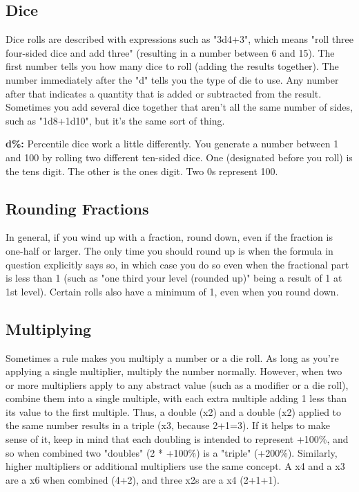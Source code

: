 \subsection{Dice}
Dice rolls are described with expressions such as "3d4+3", which means "roll three four-sided dice and add three" (resulting in a number between 6 and 15). The first number tells you how many dice to roll (adding the results together). The number immediately after the "d" tells you the type of die to use. Any number after that indicates a quantity that is added or subtracted from the result. Sometimes you add several dice together that aren't all the same number of sides, such as "1d8+1d10", but it's the same sort of thing.

\textbf{d\%:} Percentile dice work a little differently. You generate a number between 1 and 100 by rolling two different ten-sided dice. One (designated before you roll) is the tens digit. The other is the ones digit. Two 0s represent 100.

\subsection{Rounding Fractions}
In general, if you wind up with a fraction, round down, even if the fraction is one-half or larger. The only time you should round up is when the formula in question explicitly says so, in which case you do so even when the fractional part is less than 1 (such as "one third your level (rounded up)" being a result of 1 at 1st level). Certain rolls also have a minimum of 1, even when you round down.

\subsection{Multiplying}
Sometimes a rule makes you multiply a number or a die roll. As long as you're applying a single multiplier, multiply the number normally. However, when two or more multipliers apply to any abstract value (such as a modifier or a die roll), combine them into a single multiple, with each extra multiple adding 1 less than its value to the first multiple. Thus, a double (x2) and a double (x2) applied to the same number results in a triple (x3, because 2+1=3). If it helps to make sense of it, keep in mind that each doubling is intended to represent +100\%, and so when combined two "doubles" (2 * +100\%) is a "triple" (+200\%). Similarly, higher multipliers or additional multipliers use the same concept. A x4 and a x3 are a x6 when combined (4+2), and three x2s are a x4 (2+1+1).

